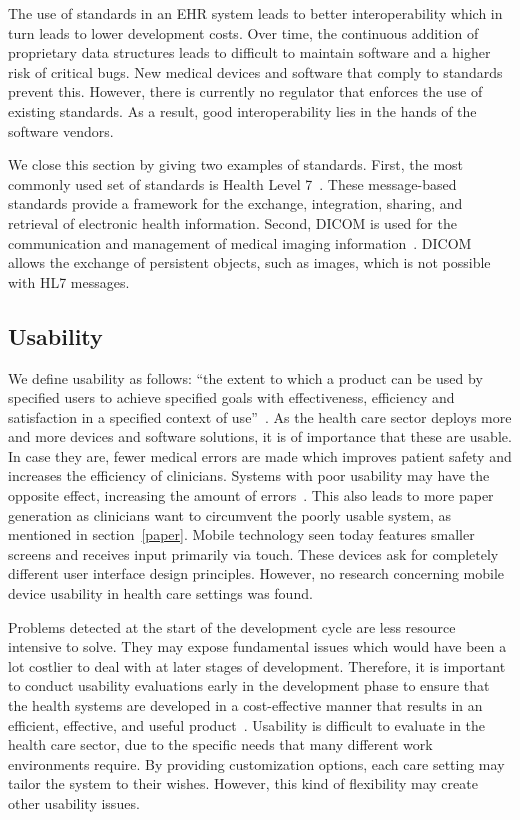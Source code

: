         The use of standards in an EHR system leads to better interoperability which in turn leads to lower development costs. Over time, the continuous addition of proprietary data structures leads to difficult to maintain software and a higher risk of critical bugs. New medical devices and software that comply to standards prevent this. However, there is currently no regulator that enforces the use of existing standards. As a result, good interoperability lies in the hands of the software vendors.

        We close this section by giving two examples of standards. First, the most commonly used set of standards is Health Level 7~\cite{HL7}. These message-based standards provide a framework for the exchange, integration, sharing, and retrieval of electronic health information. Second, DICOM is used for the communication and management of medical imaging information~\cite{Mildenberger2002}. DICOM allows the exchange of persistent objects, such as images, which is not possible with HL7 messages.

    \subsection{Usability}\label{usability}

    We define usability as follows: ``the extent to which a product can be used by specified users to achieve specified goals with effectiveness, efficiency and satisfaction in a specified context of use''~\cite{Bevan2001}. As the health care sector deploys more and more devices and software solutions, it is of importance that these are usable. In case they are, fewer medical errors are made which improves patient safety and increases the efficiency of clinicians. Systems with poor usability may have the opposite effect, increasing the amount of errors~\cite{Koppel2005}. This also leads to more paper generation as clinicians want to circumvent the poorly usable system, as mentioned in section~\ref{paper}. Mobile technology seen today features smaller screens and receives input primarily via touch. These devices ask for completely different user interface design principles. However, no research concerning mobile device usability in health care settings was found.

    Problems detected at the start of the development cycle are less resource intensive to solve. They may expose fundamental issues which would have been a lot costlier to deal with at later stages of development. Therefore, it is important to conduct usability evaluations early in the development phase to ensure that the health systems are developed in a cost-effective manner that results in an efficient, effective, and useful product~\cite{Edwards2008}. Usability is difficult to evaluate in the health care sector, due to the specific needs that many different work environments require. By providing customization options, each care setting may tailor the system to their wishes. However, this kind of flexibility may create other usability issues.

